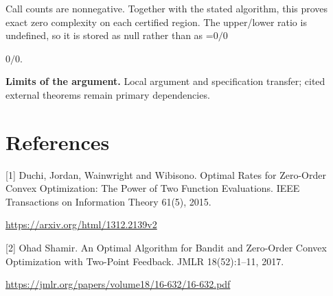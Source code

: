\documentclass[10pt,a4paper]{article}
\newcommand{\AtlasMath}[1]{\par\begingroup\centering\setbox0=\hbox{$\displaystyle #1$}\ifdim\wd0>1.4\linewidth\typeout{ATLAS WIDE FORMULA: \the\wd0}\fi\ifdim\wd0>\linewidth\resizebox{\linewidth}{!}{\box0}\else\box0\fi\par\endgroup}
\newcommand{\AtlasInlineMath}[1]{\begingroup\setbox0=\hbox{$#1$}\ifdim\wd0>.4\linewidth\endgroup\AtlasMath{#1}\else\endgroup$#1$\fi}
\begin{document}
Call counts are nonnegative. Together with the stated algorithm, this proves exact zero complexity on each certified region. The upper/lower ratio is undefined, so it is stored as null rather than as \AtlasInlineMath{0/0}.

\textbf{Limits of the argument.} Local argument and specification transfer; cited external theorems remain primary dependencies.

\section{References}
[1] Duchi, Jordan, Wainwright and Wibisono. Optimal Rates for Zero-Order Convex Optimization: The Power of Two Function Evaluations. IEEE Transactions on Information Theory 61(5), 2015.

\url{https://arxiv.org/html/1312.2139v2}

[2] Ohad Shamir. An Optimal Algorithm for Bandit and Zero-Order Convex Optimization with Two-Point Feedback. JMLR 18(52):1--11, 2017.

\url{https://jmlr.org/papers/volume18/16-632/16-632.pdf}
\end{document}
